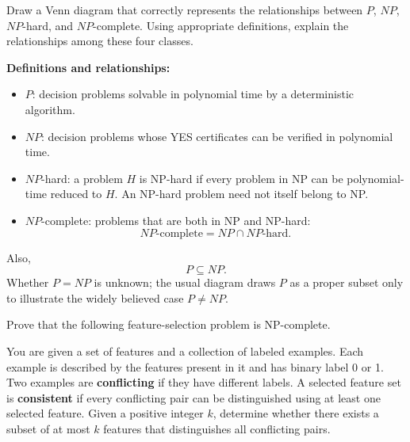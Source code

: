 \documentclass[11pt,a4paper]{article}
\begin{document}
\begin{qaquestion}
Draw a Venn diagram that correctly represents the relationships between \(P\), \(NP\), \(NP\)-hard, and \(NP\)-complete. Using appropriate definitions, explain the relationships among these four classes.
\end{qaquestion}

\begin{qaanswer}[Answer 5(a)]
\begin{center}
\end{center}

\textbf{Definitions and relationships:}
\begin{itemize}[leftmargin=1.5em]
\item \(P\): decision problems solvable in polynomial time by a deterministic algorithm.
\item \(NP\): decision problems whose YES certificates can be verified in polynomial time.
\item \(NP\)-hard: a problem \(H\) is NP-hard if every problem in NP can be polynomial-time reduced to \(H\). An NP-hard problem need not itself belong to NP.
\item \(NP\)-complete: problems that are both in NP and NP-hard:
\[
\boxed{NP\text{-complete}=NP\cap NP\text{-hard}.}
\]
\end{itemize}
Also,
\[
\boxed{P\subseteq NP}.
\]
Whether \(P=NP\) is unknown; the usual diagram draws \(P\) as a proper subset only to illustrate the widely believed case \(P\ne NP\).
\end{qaanswer}

\begin{qaquestion}
Prove that the following feature-selection problem is NP-complete.

You are given a set of features and a collection of labeled examples. Each example is described by the features present in it and has binary label 0 or 1. Two examples are \textbf{conflicting} if they have different labels. A selected feature set is \textbf{consistent} if every conflicting pair can be distinguished using at least one selected feature. Given a positive integer \(k\), determine whether there exists a subset of at most \(k\) features that distinguishes all conflicting pairs.
\end{qaquestion}
\end{document}
